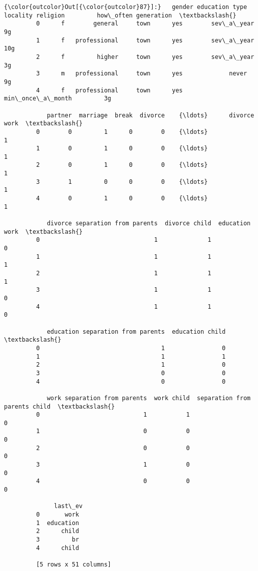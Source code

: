 \documentclass[11pt]{article}
\begin{document}
\begin{Verbatim}[commandchars=\\\{\}]
{\color{outcolor}Out[{\color{outcolor}87}]:}   gender education type locality religion         how\_often generation  \textbackslash{}
         0      f        general     town      yes        sev\_a\_year         9g   
         1      f   professional     town      yes        sev\_a\_year        10g   
         2      f         higher     town      yes        sev\_a\_year         3g   
         3      m   professional     town      yes             never         9g   
         4      f   professional     town      yes  min\_once\_a\_month         3g   
         
            partner  marriage  break  divorce    {\ldots}      divorce work  \textbackslash{}
         0        0         1      0        0    {\ldots}                 1   
         1        0         1      0        0    {\ldots}                 1   
         2        0         1      0        0    {\ldots}                 1   
         3        1         0      0        0    {\ldots}                 1   
         4        0         1      0        0    {\ldots}                 1   
         
            divorce separation from parents  divorce child  education work  \textbackslash{}
         0                                1              1               0   
         1                                1              1               1   
         2                                1              1               1   
         3                                1              1               0   
         4                                1              1               0   
         
            education separation from parents  education child  \textbackslash{}
         0                                  1                0   
         1                                  1                1   
         2                                  1                0   
         3                                  0                0   
         4                                  0                0   
         
            work separation from parents  work child  separation from parents child  \textbackslash{}
         0                             1           1                              0   
         1                             0           0                              0   
         2                             0           0                              0   
         3                             1           0                              0   
         4                             0           0                              0   
         
              last\_ev  
         0       work  
         1  education  
         2      child  
         3         br  
         4      child  
         
         [5 rows x 51 columns]
\end{Verbatim}
            
\end{document}
